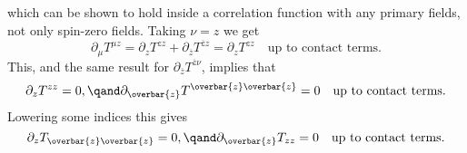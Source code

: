 \documentclass[fleqn]{NotesClass}
\begin{document}
    which can be shown to hold inside a correlation function with any primary fields, not only spin-zero fields.
    Taking \(\nu = z\) we get
    \begin{equation}
        \partial_\mu T^{\mu z} = \partial_z T^{zz} + \partial_{\overbar{z}} T^{\overbar{z}z} = \partial_z T^{zz} \quad \text{up to contact terms}.
    \end{equation}
    This, and the same result for \(\partial_{\overbar{z}}T^{\overbar{z}\nu}\), implies that
    \begin{equation}
        \partial_{z}T^{zz} = 0, \qand \partial_{\overbar{z}}T^{\overbar{z}\overbar{z}} = 0 \quad \text{up to contact terms}.
    \end{equation}
    Lowering some indices this gives
    \begin{equation}
        \partial_z T_{\overbar{z}\overbar{z}} = 0, \qand \partial_{\overbar{z}} T_{zz} = 0 \quad \text{up to contact terms}.
    \end{equation}
    
    
    
    
    
    
    
    
    
\end{document}
